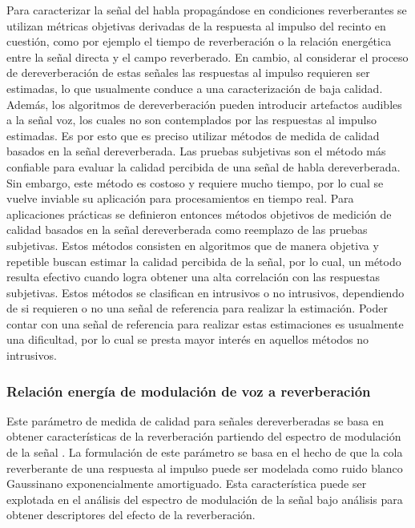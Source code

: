Para caracterizar la señal del habla propagándose en condiciones reverberantes se utilizan métricas objetivas derivadas de la respuesta al impulso del recinto en cuestión, como por ejemplo el tiempo de reverberación o la relación energética entre la señal directa y el campo reverberado. En cambio, al considerar el proceso de dereverberación de estas señales las respuestas al impulso requieren ser estimadas, lo que usualmente conduce a una caracterización de baja calidad. Además, los algoritmos de dereverberación pueden introducir artefactos audibles a la señal voz, los cuales no son contemplados por las respuestas al impulso estimadas. Es por esto que es preciso utilizar métodos de medida de calidad basados en la señal dereverberada. Las pruebas subjetivas son el método más confiable para evaluar la calidad percibida de una señal de habla dereverberada. Sin embargo, este método es costoso y requiere mucho tiempo, por lo cual se vuelve inviable su aplicación para procesamientos en tiempo real. Para aplicaciones prácticas se definieron entonces métodos objetivos de medición de calidad basados en la señal dereverberada como reemplazo de las pruebas subjetivas. Estos métodos consisten en algoritmos que de manera objetiva y repetible buscan estimar la calidad percibida de la señal, por lo cual, un método resulta efectivo cuando logra obtener una alta correlación con las respuestas subjetivas. Estos métodos se clasifican en intrusivos o no intrusivos, dependiendo de si requieren o no una señal de referencia para realizar la estimación. Poder contar con una señal de referencia para realizar estas estimaciones es usualmente una dificultad, por lo cual se presta mayor interés en aquellos métodos no intrusivos. 

\subsubsection{Relación energía de modulación de voz a reverberación}

Este parámetro de medida de calidad para señales dereverberadas se basa en obtener características de la reverberación partiendo del espectro de modulación de la señal \cite{SRMR}. La formulación de este parámetro se basa en el hecho de que la cola reverberante de una respuesta al impulso puede ser modelada como ruido blanco Gaussinano exponencialmente amortiguado. Esta característica puede ser explotada en el análisis del espectro de modulación de la señal bajo análisis para obtener descriptores del efecto de la reverberación.

